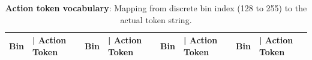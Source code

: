 \begin{table}[!htbp]
\centering
\footnotesize
\setlength{\tabcolsep}{1pt}
\setlength{\arrayrulewidth}{0.1pt}
\renewcommand{\arraystretch}{1.1}
\caption{\textbf{Action token vocabulary}: Mapping from discrete bin index (128 to 255) to the actual token string.}
\label{tab:action_vocab_2}
\begin{tabular}{r l r l r l r l}
\toprule
\textbf{Bin} & \textbf{| Action Token} & \textbf{Bin} & \textbf{| Action Token} & \textbf{Bin} & \textbf{| Action Token} & \textbf{Bin} & \textbf{| Action Token} \\
\midrule

\end{tabular}
\end{table}

